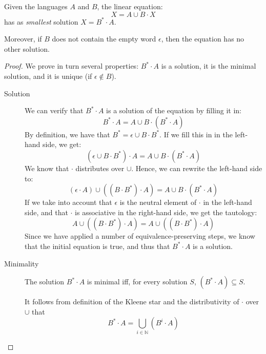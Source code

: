 \begin{theorem}
Given the languages $A$ and $B$, the linear equation:
\begin{equation*}
X = A \cup B \cdot X
\end{equation*}
has as \emph{smallest} solution $X = B^* \cdot A$. 

Moreover, if $B$ does not contain the empty word $\epsilon$, then the equation
has no other solution.
\end{theorem}
\begin{proof}

We prove in turn several properties: $B^*\cdot A$ is a solution, it is the minimal
solution, and it is unique (if $\epsilon \not\in B$).
\begin{description}
\item[Solution]
We can verify that $B^* \cdot A$ is a solution of the equation by filling it in:
\begin{equation*}
B^* \cdot A = A \cup B \cdot (B^* \cdot A)
\end{equation*}
By definition, we have that $B^* = \epsilon \cup B \cdot B^*$. If we fill this
in in the left-hand side, we get:
\begin{equation*}
(\epsilon \cup B \cdot B^*) \cdot A = A \cup B \cdot (B^* \cdot A)
\end{equation*}
We know that $\cdot$ distributes over $\cup$. Hence, we can rewrite the left-hand
side to:
\begin{equation*}
(\epsilon \cdot A) \cup ((B \cdot B^*) \cdot A) = A \cup B \cdot (B^* \cdot A)
\end{equation*}
If we take into account that $\epsilon$ is the neutral element of $\cdot$ in the left-hand
side, and that $\cdot$ is associative in the right-hand side, we get the tautology:
\begin{equation*}
A \cup ((B \cdot B^*) \cdot A) = A \cup ((B \cdot B^*) \cdot A)
\end{equation*}
Since we have applied a number of equivalence-preserving steps, we know that the initial
equation is true, and thus that $B^* \cdot A$ is a solution.

\item[Minimality]
  The solution $B^* \cdot A$ is minimal iff, for every solution $S$, $(B^* \cdot A) \subseteq S$.

  It follows from definition of the Kleene star and the distributivity of $\cdot$ over $\cup$ that
  \begin{equation*}
   B^* \cdot A = \bigcup_{i \in \mathbb{N}} (B^i \cdot A)
 \end{equation*}


\end{description}
\end{proof}
